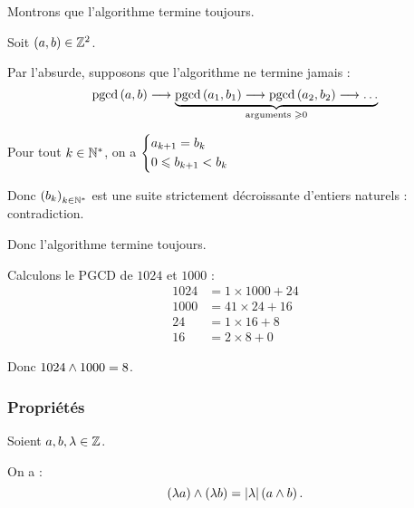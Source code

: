 \begin{dem}[Terminaison]
Montrons que l'algorithme termine toujours.

Soit \(\paren{a,b}\in\Z^2\).

Par l'absurde, supposons que l'algorithme ne termine jamais : \[\pgcd[a][b]\to\underbrace{\pgcd[a_1][b_1]\to\pgcd[a_2][b_2]\to\dots}_{\text{arguments }\geq0}\]

Pour tout \(k\in\Ns\), on a \(\begin{dcases}a_{k+1}=b_k \\ 0\leq b_{k+1}<b_k\end{dcases}\)

Donc \(\paren{b_k}_{k\in\Ns}\) est une suite strictement décroissante d'entiers naturels : contradiction.

Donc l'algorithme termine toujours.
\end{dem}

\begin{ex}
Calculons le PGCD de \(1024\) et \(1000\) : \[\begin{aligned}
1024&=1\times1000+24 \\
1000&=41\times24+16 \\
24&=1\times16+8 \\
16&=2\times8+0
\end{aligned}\]

Donc \(1024\et1000=8\).
\end{ex}

\subsubsection{Propriétés}

\begin{prop}
Soient \(a,b,\lambda\in\Z\).

On a : \[\paren{\lambda a}\et\paren{\lambda b}=\abs{\lambda}\paren{a\et b}.\]
\end{prop}

